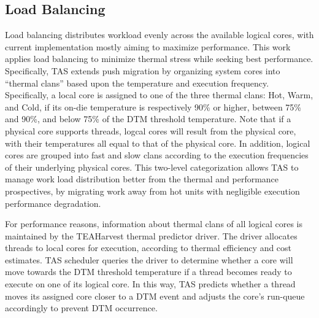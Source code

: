 \documentclass[times, 10pt,twocolumn]{IEEEtran}
\begin{document}
\subsection{Load Balancing}
\label{sec:loadbalance} 
Load balancing distributes workload evenly
across the available logical cores, with current implementation mostly
aiming to maximize performance.  This work applies load balancing
to minimize thermal stress while seeking best performance.
Specifically, TAS extends push migration by organizing system
cores into ``thermal clans'' based upon the temperature
and execution frequency.   Specifically, a local core is assigned
to one of the three thermal clans: Hot, Warm, and Cold, if its on-die temperature
is respectively 90\% or higher, between 75\% and 90\%, and below 75\% of the DTM threshold temperature.
Note that if a physical core supports \alpha threads,
\alpha logcal cores will result from the physical core,
with their temperatures all equal to that of the physical core.
In addition, logical cores are grouped into fast and slow
clans according to the execution frequencies of their underlying
physical cores.  This two-level categorization allows TAS to manage work
load distribution better from the thermal and performance prospectives,
by migrating work away from hot units with negligible execution performance degradation.

For performance reasons, information about thermal clans of all logical cores
is maintained by the TEAHarvest thermal predictor driver.  The driver
allocates threads to local cores for execution,
according to thermal efficiency and cost estimates.
TAS scheduler queries the driver to determine whether a core will move towards
the DTM threshold temperature if a thread becomes ready to execute on one of
its logical core. 
In this way, TAS predicts whether a thread moves
its assigned core closer to a DTM event and adjusts the core's
run-queue accordingly to prevent DTM occurrence.
\end{document}
